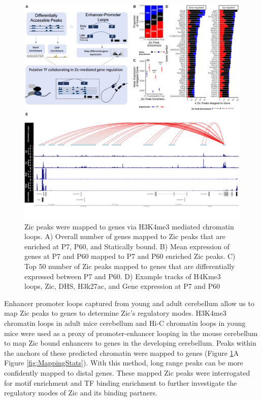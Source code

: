 \documentclass[fleqn,10pt,twocolumn]{wlscirep}
\begin{document}
\begin{figure}[!ht]
\includegraphics[width=.95\textwidth]{../figures/figure3.png}
\caption{Zic peaks were mapped to genes via H3K4me3 mediated chromatin loops. A) Overall number of genes mapped to Zic peaks that are enriched at P7, P60, and Statically bound. B) Mean expression of genes at P7 and P60 mapped to P7 and P60 enriched Zic peaks. C) Top 50 number of Zic peaks mapped to genes that are differentially expressed between P7 and P60. D) Example tracks of H4Kme3 loops, Zic, DHS, H3k27ac, and Gene expression at P7 and P60}
\label{fig:PeakMapping}
\end{figure}

Enhancer promoter loops captured from young and adult cerebellum allow us to map Zic peaks to genes to determine Zic's regulatory modes. H3K4me3 chromatin loops in adult mice cerebellum \cite{Yamada2019SensoryLearning} and Hi-C chromatin loops in young mice \cite{Goodman2020TheBrain}  were used as a proxy of promoter-enhancer looping in the mouse cerebellum  to map Zic bound enhancers to genes in the developing cerebellum. Peaks within the anchors of these predicted chromatin were mapped to genes (Figure \ref{fig:PeakMapping}A Figure \ref{fig:MappingStats}). With this method, long range peaks can be more confidently mapped to distal genes. These mapped Zic peaks were interrogated for motif enrichment and TF binding enrichment to further investigate the regulatory modes of Zic and its binding partners. 
\end{document}

